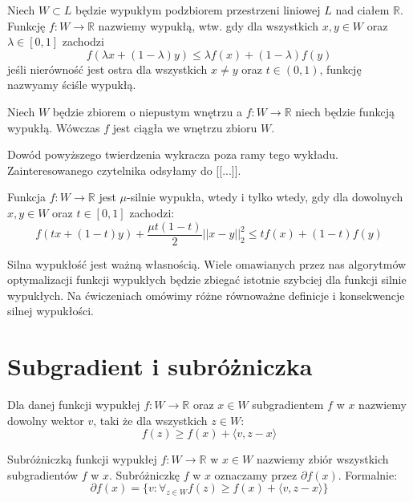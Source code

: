 \documentclass[10pt,a4paper,draft]{report}
\begin{document}
\begin{definition} 
Niech $W \subset L$ będzie wypukłym podzbiorem przestrzeni liniowej $L$ nad ciałem $\mathbb{R}$. Funkcję $f : W \rightarrow \mathbb{R}$ nazwiemy wypukłą, wtw. gdy dla wszystkich $x,y \in W$ oraz $\lambda \in [0,1]$ zachodzi
\[
f(\lambda x + (1-\lambda)y ) \leq \lambda f(x) + (1 - \lambda) f(y)
\]
jeśli nierówność jest ostra dla wszystkich $x \neq y$ oraz $t \in (0,1)$, funkcję nazwyamy ściśle wypukłą.
\end{definition}

\begin{theorem}
Niech $W$ będzie zbiorem o niepustym wnętrzu a $f : W \rightarrow \mathbb{R}$ niech będzie funkcją wypukłą. Wówczas $f$ jest ciągła we wnętrzu zbioru $W$.
\end{theorem}
Dowód powyższego twierdzenia wykracza poza ramy tego wykładu. Zainteresowanego czytelnika odsyłamy do [[...]].


\begin{definition} 
Funkcja $f: W \rightarrow \mathbb{R}$ jest $\mu$-silnie wypukła, wtedy i tylko wtedy, gdy dla dowolnych $x,y \in W$ oraz $t \in [0,1]$ zachodzi:
\[
f(tx + (1-t)y) + \frac{\mu t(1-t)}{2}||x-y||_2^2 \leq tf(x) + (1-t)f(y) 
\]
\end{definition}

Silna wypukłość jest ważną własnością. Wiele omawianych przez nas algorytmów optymalizacji funkcji wypukłych będzie zbiegać istotnie szybciej dla funkcji silnie wypukłych. Na ćwiczeniach omówimy różne równoważne definicje i konsekwencje silnej wypukłości.


\section{Subgradient i subróżniczka}



\begin{definition}[Subgradient]
Dla danej funkcji wypukłej $f : W \rightarrow \mathbb{R}$ oraz $x \in W$ subgradientem $f$ w $x$ nazwiemy dowolny wektor $v$, taki że dla wszystkich $z \in W$:
\[
f(z) \geq f(x) + \langle v , z - x \rangle
\]
\end{definition}

\begin{definition}[Subróżniczka]
Subróżniczką funkcji wypukłej $f: W \rightarrow \mathbb{R}$ w $x \in W$ nazwiemy zbiór wszystkich subgradientów $f$ w $x$. Subróżniczkę $f$ w $x$ oznaczamy przez $\partial f(x)$. Formalnie:
\[
\partial f(x) = \{ v : \forall_{z \in W} f(z) \geq f(x) + \langle v, z - x\rangle \}
\]
\end{definition}
\end{document}
